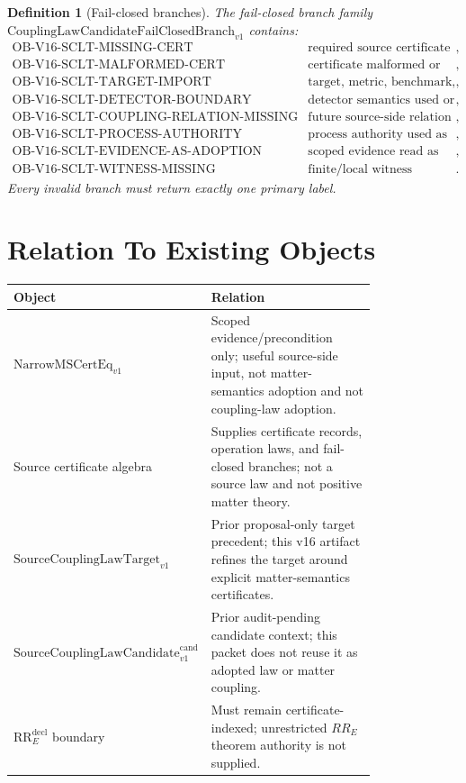 \documentclass[11pt]{article}
\newcommand{\NarrowMSCertEq}{\mathrm{NarrowMSCertEq}_{v1}}
\newcommand{\RREObj}{\mathrm{RR}_{E}^{\mathrm{decl}}}
\newcommand{\SourceCoupTargetOld}{\mathrm{SourceCouplingLawTarget}_{v1}}
\newcommand{\SourceCoupCandOld}{\mathrm{SourceCouplingLawCandidate}^{\mathrm{cand}}_{v1}}
\newcommand{\FailBranch}{\mathrm{CouplingLawCandidateFailClosedBranch}_{v1}}
\newtheorem{definition}{Definition}
\begin{document}
\begin{definition}[Fail-closed branches]
The fail-closed branch family \(\FailBranch\) contains:
\[
\begin{array}{ll}
\mathrm{OB\text{-}V16\text{-}SCLT\text{-}MISSING\text{-}CERT} &
\text{required source certificate absent},\\
\mathrm{OB\text{-}V16\text{-}SCLT\text{-}MALFORMED\text{-}CERT} &
\text{certificate malformed or object-mismatched},\\
\mathrm{OB\text{-}V16\text{-}SCLT\text{-}TARGET\text{-}IMPORT} &
\text{target, metric, benchmark, stress-energy, action, or Einstein import},\\
\mathrm{OB\text{-}V16\text{-}SCLT\text{-}DETECTOR\text{-}BOUNDARY} &
\text{detector semantics used or placeholder absent without blocked status},\\
\mathrm{OB\text{-}V16\text{-}SCLT\text{-}COUPLING\text{-}RELATION\text{-}MISSING} &
\text{future source-side relation or partial map not supplied},\\
\mathrm{OB\text{-}V16\text{-}SCLT\text{-}PROCESS\text{-}AUTHORITY} &
\text{process authority used as mathematical premise},\\
\mathrm{OB\text{-}V16\text{-}SCLT\text{-}EVIDENCE\text{-}AS\text{-}ADOPTION} &
\text{scoped evidence read as adoption},\\
\mathrm{OB\text{-}V16\text{-}SCLT\text{-}WITNESS\text{-}MISSING} &
\text{finite/local witness obligation not met}.
\end{array}
\]
Every invalid branch must return exactly one primary label.
\end{definition}

\section{Relation To Existing Objects}

\begin{longtable}{p{0.28\linewidth}p{0.52\linewidth}}
\toprule
Object & Relation \\
\midrule
\(\NarrowMSCertEq\) & Scoped evidence/precondition only; useful source-side
input, not matter-semantics adoption and not coupling-law adoption. \\
Source certificate algebra & Supplies certificate records, operation laws,
and fail-closed branches; not a source law and not positive matter theory. \\
\(\SourceCoupTargetOld\) & Prior proposal-only target precedent; this v16
artifact refines the target around explicit matter-semantics certificates. \\
\(\SourceCoupCandOld\) & Prior audit-pending candidate context; this packet
does not reuse it as adopted law or matter coupling. \\
\(\RREObj\) boundary & Must remain certificate-indexed; unrestricted
\(RR_E\) theorem authority is not supplied. \\
\bottomrule
\end{longtable}
\end{document}
